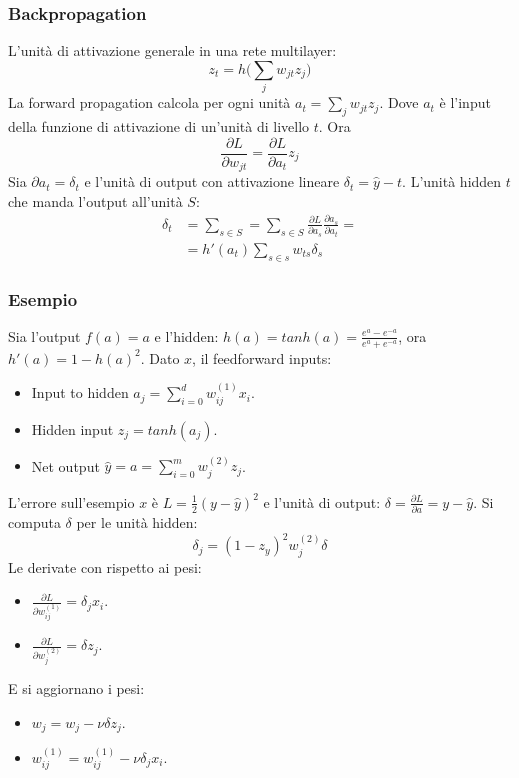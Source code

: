 		\subsubsection{Backpropagation}
		L'unit\`a di attivazione generale in una rete multilayer:
		$$z_t = h\bigl(\sum\limits_jw_{jt}z_j\bigr)$$
		La forward propagation calcola per ogni unit\`a $a_t = \sum\limits_j w_{jt}z_j$.
		Dove $a_t$ \`e l'input della funzione di attivazione di un'unit\`a di livello $t$.
		Ora
		$$\frac{\partial L}{\partial w_{jt}} = \frac{\partial L}{\partial a_t}z_j$$
		Sia $\partial a_t = \delta_t$ e l'unit\`a di output con attivazione lineare $\delta_t = \hat{y} -t$.
		L'unit\`a hidden $t$ che manda l'output all'unit\`a $S$:
		\begin{align*}
			\delta_t &= \sum\limits_{s\in S} = \sum\limits_{s\in S}\frac{\partial L}{\partial a_s}\frac{\partial a_s}{\partial a_t}=\\
			&= h'(a_t)\sum\limits_{s\in s} w_{ts}\delta_s
		\end{align*}

		\subsubsection{Esempio}
		Sia l'output $f(a) = a$ e l'hidden: $h(a) = tanh(a) = \frac{e^a-e^{-a}}{e^a+e^{-a}}$, ora $h'(a) = 1-h(a)^2$.
		Dato $x$, il feedforward inputs:
		\begin{multicols}{2}
			\begin{itemize}
				\item Input to hidden $a_j = \sum\limits_{i = 0}^d w_{ij}^{(1)}x_i$.
				\item Hidden input $z_j = tanh(a_j)$.
				\item Net output $\hat{y} = a = \sum\limits_{i = 0}^m w_j^{(2)} z_j$.
			\end{itemize}
		\end{multicols}
		L'errore sull'esempio $x$ \`e $L= \frac{1}{2}(y-\hat{y})^2$ e l'unit\`a di output: $\delta = \frac{\partial L}{\partial a} = y - \hat{y}$.
		Si computa $\delta$ per le unit\`a hidden:
		$$\delta_j = (1-z_y)^2w_j^{(2)}\delta$$
		Le derivate con rispetto ai pesi:
		\begin{multicols}{2}
			\begin{itemize}
				\item $\frac{\partial L}{\partial w_{ij}^{(1)}} = \delta_jx_i$.
				\item $\frac{\partial L}{\partial w_j^{(2)}} = \delta z_j$.
			\end{itemize}
		\end{multicols}
		E si aggiornano i pesi:
		\begin{multicols}{2}
			\begin{itemize}
				\item $w_j = w_j - \nu \delta z_j$.
				\item $w_{ij}^{(1)} = w_{ij}^{(1)} - \nu \delta_jx_i$.
			\end{itemize}
		\end{multicols}

